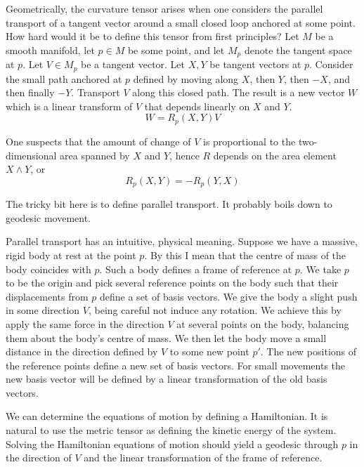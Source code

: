 \documentclass[11pt, oneside]{article}
\begin{document}
Geometrically, the curvature tensor arises when one considers the parallel transport of a tangent vector around a
small closed loop anchored at some point.
How hard would it be to define this tensor from first principles?
Let $M$ be a smooth manifold, let $p \in M$ be some point, and let $M_p$ denote the tangent space at $p$.
Let $V \in M_p$ be a tangent vector.
Let $X, Y$ be tangent vectors at $p$.
Consider the small path anchored at $p$ defined by moving along $X$, then $Y$, then $-X$, and then finally $-Y$.
Transport $V$ along this closed path.
The result is a new vector $W$ which is a linear transform of $V$ that depends linearly on $X$ and $Y$.
\begin{equation}
	W = R_p(X,Y)V
\end{equation}

One suspects that the amount of change of $V$ is proportional to the two-dimensional area spanned by $X$ and $Y$, hence $R$ depends
on the area element $X \wedge Y$, or 
\begin{equation}
	R_p(X,Y) = -R_p(Y,X)
\end{equation}

The tricky bit here is to define parallel transport.
It probably boils down to geodesic movement.

Parallel transport has an intuitive, physical meaning.
Suppose we have a massive, rigid body at rest at the point $p$.
By this I mean that the centre of mass of the body coincides with $p$.
Such a body defines a frame of reference at $p$.
We take $p$ to be the origin and pick several reference points on the body such that their displacements from $p$ define a set of basis vectors.
We give the body a slight push in some direction $V$, being careful not induce any rotation.
We achieve this by apply the same force in the direction $V$ at several points on the body, balancing them about the body's centre of mass.
We then let the body move a small distance in the direction defined by $V$ to some new point $p'$.
The new positions of the reference points define a new set of basis vectors.
For small movements the new basis vector will be defined by a linear transformation of the old basis vectors.

We can determine the equations of motion by defining a Hamiltonian.
It is natural to use the metric tensor as defining the kinetic energy of the system.
Solving the Hamiltonian equations of motion should yield a geodesic through $p$ in the direction of $V$ and the linear transformation of
the frame of reference.
\end{document}

